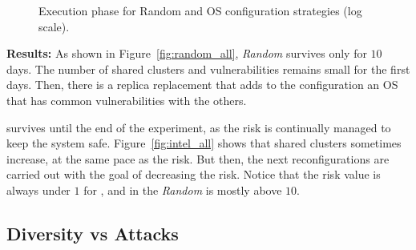 \begin{figure}[h]
\hspace{0.5cm}
\caption{Execution phase for Random and \system OS configuration strategies (log scale).}
\label{fig:run_all}
\end{figure}

\textbf{Results:} As shown in Figure~\ref{fig:random_all}, \emph{Random} survives only for $10$ days. 
The number of shared clusters and vulnerabilities remains small for the first days. 
Then, there is a replica replacement that adds to the configuration an OS that has common vulnerabilities with the others. 

\system survives until the end of the experiment, as the risk is continually managed to keep the system safe. Figure~\ref{fig:intel_all} shows that shared clusters sometimes increase, at the same pace as the risk.
But then, the next reconfigurations are carried out with the goal of decreasing the risk. 
Notice that the risk value is always under $1$ for \system, and in the \emph{Random} is mostly above $10$.


\subsection{Diversity vs Attacks}

